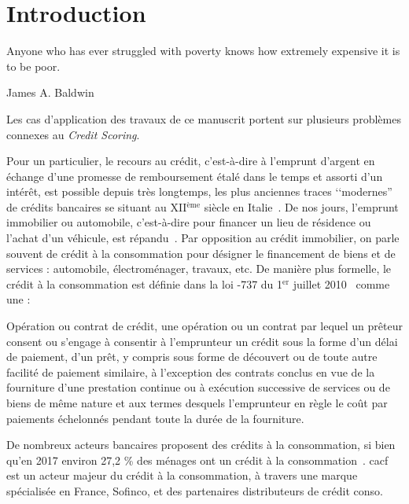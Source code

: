 \chapter*{\nmu Introduction} \label{chap_intro}

\epigraph{Anyone who has ever struggled with poverty knows how extremely expensive it is to be poor.}{James A. Baldwin}

Les cas d'application des travaux de ce manuscrit portent sur plusieurs problèmes connexes au \textit{Credit Scoring}.

Pour un particulier, le recours au crédit, c'est-à-dire à l'emprunt d'argent en échange d'une promesse de remboursement étalé dans le temps et assorti d'un intérêt, est possible depuis très longtemps, les plus anciennes traces ‘‘modernes'' de crédits bancaires se situant au XII$^\text{ème}$ siècle en Italie~\cite{thomas_wards_1828}. De nos jours, l'emprunt immobilier ou automobile, c'est-à-dire pour financer un lieu de résidence ou l'achat d'un véhicule, est répandu~\cite{la_tribune_2010}. Par opposition au crédit immobilier, on parle souvent de crédit à la consommation pour désigner le financement de biens et de services : automobile, électroménager, travaux, etc. De manière plus formelle, le crédit à la consommation est définie dans la loi -737 du 1$^\text{er}$ juillet 2010~\cite{noauthor_loi_2010} comme une :
\begin{displayquote}
Opération ou contrat de crédit, une opération ou un contrat par lequel un prêteur consent ou s’engage à consentir à l’emprunteur un crédit sous la forme d’un délai de paiement, d’un prêt, y compris sous forme de découvert ou de toute autre facilité de paiement similaire, à l’exception des contrats conclus en vue de la fourniture d’une prestation continue ou à exécution successive de services ou de biens de même nature et aux termes desquels l’emprunteur en règle le coût par paiements échelonnés pendant toute la durée de la fourniture.
\end{displayquote}

De nombreux acteurs bancaires proposent des crédits à la consommation, si bien qu'en 2017 environ 27,2 \% des ménages ont un crédit à la consommation~\cite{observatoire}. \gls{cacf} est un acteur majeur du crédit à la consommation, à travers une marque spécialisée en France, Sofinco, et des partenaires distributeurs de crédit conso.


